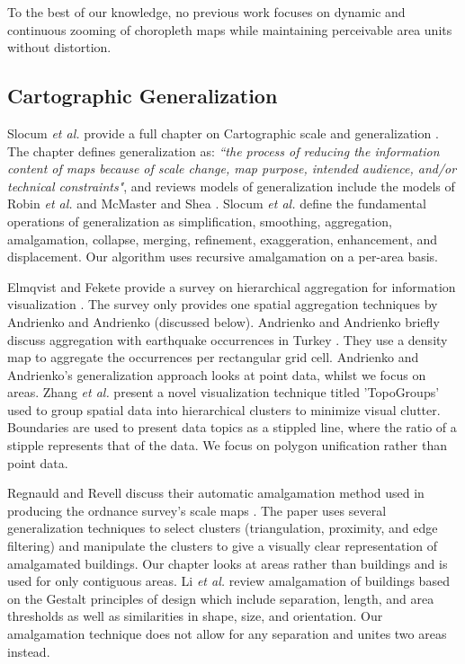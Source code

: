  To the best of our knowledge, no previous work focuses on dynamic and continuous zooming of choropleth maps while maintaining perceivable area units without distortion.
 
\subsection{Cartographic Generalization}
Slocum \textit{et al.} provide a full chapter on Cartographic scale and generalization \cite{slocum2009thematic}. The chapter defines generalization as: \textit{``the process of reducing the information content of maps because of scale change, map purpose, intended audience, and/or technical constraints"}, and reviews models of generalization include the models of Robin \textit{et al.} \cite{robinson1978elements} and McMaster and Shea \cite{mcmaster1992generalization}. Slocum \textit{et al.} define the fundamental operations of generalization as simplification, smoothing, aggregation, amalgamation, collapse, merging, refinement, exaggeration, enhancement, and displacement. Our algorithm uses recursive amalgamation on a per-area basis.

Elmqvist and Fekete provide a survey on hierarchical aggregation for information visualization \cite{elmqvist2010hierarchical}. The survey only provides one spatial aggregation techniques by Andrienko and Andrienko (discussed below). Andrienko and Andrienko briefly discuss aggregation with earthquake occurrences in Turkey \cite{andrienko2006exploratory}. They use a density map to aggregate the occurrences per rectangular grid cell. Andrienko and Andrienko's generalization approach looks at point data, whilst we focus on areas. Zhang \textit{et al.} present a novel visualization technique titled 'TopoGroups' \cite{zhang2017topogroups} used to group spatial data into hierarchical clusters to minimize visual clutter. Boundaries are used to present data topics as a stippled line, where the ratio of a stipple represents that of the data. We focus on polygon unification rather than point data.

Regnauld and Revell discuss their automatic amalgamation method used in producing the ordnance survey's scale maps \cite{regnauld2007automatic}. The paper uses several generalization techniques to select clusters (triangulation, proximity, and edge filtering) and manipulate the clusters to give a visually clear representation of amalgamated buildings. Our chapter looks at areas rather than buildings and is used for only contiguous areas. Li \textit{et al.} review amalgamation of buildings based on the Gestalt principles of design \cite{li2004automated} which include separation, length, and area thresholds as well as similarities in shape, size, and orientation. Our amalgamation technique does not allow for any separation and unites two areas instead. 

